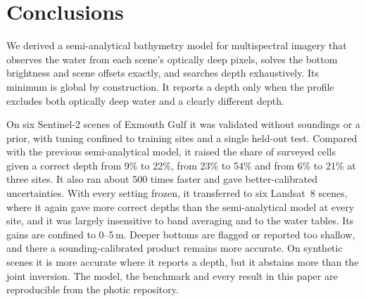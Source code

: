 \documentclass[remotesensing,article,submit,pdftex]{Definitions/mdpi}
\begin{document}
\section{Conclusions}

We derived a semi-analytical bathymetry model for multispectral imagery that observes the water from each scene's optically deep pixels, solves the bottom brightness and scene offsets exactly, and searches depth exhaustively. Its minimum is global by construction. It reports a depth only when the profile excludes both optically deep water and a clearly different depth.

On six Sentinel-2 scenes of Exmouth Gulf it was validated without soundings or a prior, with tuning confined to training sites and a single held-out test. Compared with the previous semi-analytical model, it raised the share of surveyed cells given a correct depth from 9\% to 22\%, from 23\% to 54\% and from 6\% to 21\% at three sites. It also ran about 500 times faster and gave better-calibrated uncertainties. With every setting frozen, it transferred to six Landsat~8 scenes, where it again gave more correct depths than the semi-analytical model at every site, and it was largely insensitive to band averaging and to the water tables. Its gains are confined to 0--5\,m. Deeper bottoms are flagged or reported too shallow, and there a sounding-calibrated product remains more accurate. On synthetic scenes it is more accurate where it reports a depth, but it abstains more than the joint inversion. The model, the benchmark and every result in this paper are reproducible from the photic repository.

\vspace{6pt}





\end{document}
